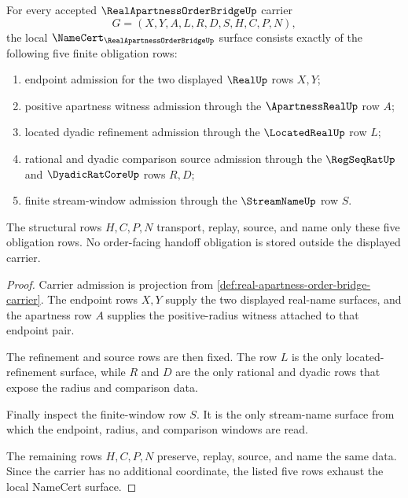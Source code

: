 \begin{theorem}
\label{thm:real-apartness-order-bridge-namecert-obligations}
For every accepted $\RealApartnessOrderBridgeUp$ carrier
$$
G=(X,Y,A,L,R,D,S,H,C,P,N),
$$
the local $\NameCert_{\RealApartnessOrderBridgeUp}$ surface consists exactly of the following five finite obligation rows:
\begin{enumerate}
\item endpoint admission for the two displayed $\RealUp$ rows $X,Y$;
\item positive apartness witness admission through the $\ApartnessRealUp$ row $A$;
\item located dyadic refinement admission through the $\LocatedRealUp$ row $L$;
\item rational and dyadic comparison source admission through the $\RegSeqRatUp$ and $\DyadicRatCoreUp$ rows $R,D$;
\item finite stream-window admission through the $\StreamNameUp$ row $S$.
\end{enumerate}
The structural rows $H,C,P,N$ transport, replay, source, and name only these five obligation rows. No order-facing handoff obligation is stored outside the displayed carrier.
\end{theorem}
\begin{proof}
Carrier admission is projection from \autoref{def:real-apartness-order-bridge-carrier}. The endpoint rows $X,Y$ supply the two displayed real-name surfaces, and the apartness row $A$ supplies the positive-radius witness attached to that endpoint pair.

The refinement and source rows are then fixed. The row $L$ is the only located-refinement surface, while $R$ and $D$ are the only rational and dyadic rows that expose the radius and comparison data.

Finally inspect the finite-window row $S$. It is the only stream-name surface from which the endpoint, radius, and comparison windows are read.

The remaining rows $H,C,P,N$ preserve, replay, source, and name the same data. Since the carrier has no additional coordinate, the listed five rows exhaust the local NameCert surface.
\end{proof}

